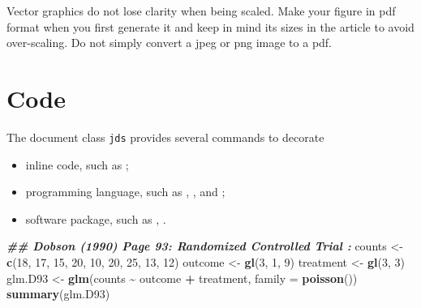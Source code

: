 \documentclass[letterpaper,inpress]{jdsart}
\newenvironment{Shaded}{\begin{snugshade}}{\end{snugshade}}
\newcommand{\AttributeTok}[1]{\textcolor[rgb]{0.13,0.29,0.53}{#1}}
\newcommand{\DecValTok}[1]{\textcolor[rgb]{0.00,0.00,0.81}{#1}}
\newcommand{\DocumentationTok}[1]{\textcolor[rgb]{0.56,0.35,0.01}{\textbf{\textit{#1}}}}
\newcommand{\FunctionTok}[1]{\textcolor[rgb]{0.13,0.29,0.53}{\textbf{#1}}}
\newcommand{\NormalTok}[1]{#1}
\newcommand{\OtherTok}[1]{\textcolor[rgb]{0.56,0.35,0.01}{#1}}
\newcommand{\SpecialCharTok}[1]{\textcolor[rgb]{0.81,0.36,0.00}{\textbf{#1}}}
\begin{document}
Vector graphics do not lose clarity when being scaled. Make your
figure in pdf format when you first generate it and keep in mind its
sizes in the article to avoid over-scaling. Do not simply convert a
jpeg or png image to a pdf.

\hypertarget{code}{%
\section{Code}\label{code}}

The document class \texttt{jds} provides several commands to decorate

\begin{itemize}
\item inline code, such as ;
\item programming language, such as , , and
  ;
\item software package, such as , .
\end{itemize}

\begin{Shaded}
\begin{Highlighting}[]
\DocumentationTok{\#\# Dobson (1990) Page 93: Randomized Controlled Trial :}
\NormalTok{counts }\OtherTok{\textless{}{-}} \FunctionTok{c}\NormalTok{(}\DecValTok{18}\NormalTok{, }\DecValTok{17}\NormalTok{, }\DecValTok{15}\NormalTok{, }\DecValTok{20}\NormalTok{, }\DecValTok{10}\NormalTok{, }\DecValTok{20}\NormalTok{, }\DecValTok{25}\NormalTok{, }\DecValTok{13}\NormalTok{, }\DecValTok{12}\NormalTok{)}
\NormalTok{outcome }\OtherTok{\textless{}{-}} \FunctionTok{gl}\NormalTok{(}\DecValTok{3}\NormalTok{, }\DecValTok{1}\NormalTok{, }\DecValTok{9}\NormalTok{)}
\NormalTok{treatment }\OtherTok{\textless{}{-}} \FunctionTok{gl}\NormalTok{(}\DecValTok{3}\NormalTok{, }\DecValTok{3}\NormalTok{)}
\NormalTok{glm.D93 }\OtherTok{\textless{}{-}} \FunctionTok{glm}\NormalTok{(counts }\SpecialCharTok{\textasciitilde{}}\NormalTok{ outcome }\SpecialCharTok{+}\NormalTok{ treatment, }\AttributeTok{family =} \FunctionTok{poisson}\NormalTok{())}
\FunctionTok{summary}\NormalTok{(glm.D93)}
\end{Highlighting}
\end{Shaded}
\end{document}
